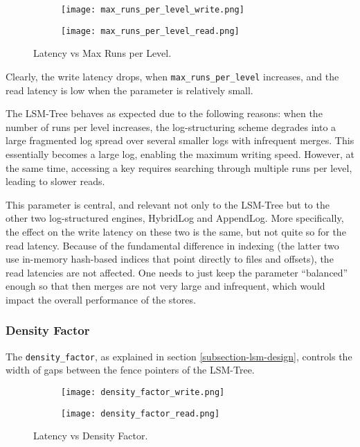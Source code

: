 \begin{figure}[h]
    \begin{subfigure}{.5\textwidth}
        \centering
        \texttt{[image: max\_runs\_per\_level\_write.png]}
    \end{subfigure}
    \begin{subfigure}{.5\textwidth}
        \centering
        \texttt{[image: max\_runs\_per\_level\_read.png]}
    \end{subfigure}
    \caption{Latency vs Max Runs per Level.}
    \label{fig:max-runs-per-level}
\end{figure}

Clearly, the write latency drops, when \verb"max_runs_per_level" increases, and the read latency is low when the parameter is relatively small.

The LSM-Tree behaves as expected due to the following reasons: when the number of runs per level increases, the log-structuring scheme degrades into a large fragmented log spread over several smaller logs with infrequent merges. This essentially becomes a large log, enabling the maximum writing speed. However, at the same time, accessing a key requires searching through multiple runs per level, leading to slower reads.

This parameter is central, and relevant not only to the LSM-Tree but to the other two log-structured engines, HybridLog and AppendLog. More specifically, the effect on the write latency on these two is the same, but not quite so for the read latency. Because of the fundamental difference in indexing (the latter two use in-memory hash-based indices that point directly to files and offsets), the read latencies are not affected. One needs to just keep the parameter ``balanced'' enough so that then merges are not very large and infrequent, which would impact the overall performance of the stores.

\subsubsection{Density Factor}
The \verb"density_factor", as explained in section \ref{subsection-lsm-design}, controls the width of gaps between the fence pointers of the LSM-Tree.

\begin{figure}[h]
    \begin{subfigure}{.5\textwidth}
        \centering
        \texttt{[image: density\_factor\_write.png]}
    \end{subfigure}
    \begin{subfigure}{.5\textwidth}
        \centering
        \texttt{[image: density\_factor\_read.png]}
    \end{subfigure}
    \caption{Latency vs Density Factor.}
    \label{fig:density_factor_write_read}
\end{figure}

